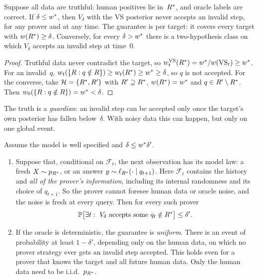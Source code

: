 \begin{theorem}\label{thm:caution:bayesdet}
Suppose all data are truthful: human positives lie in~$R^{*}$, and oracle labels are correct. If $\delta\le w^{*}$, then $V_\delta$ with the VS posterior never accepts an invalid step, for any prover and at any time. The guarantee is per target: it covers every target with $w(R^{*})\ge\delta$. Conversely, for every $\delta>w^{*}$ there is a two-hypothesis class on which $V_\delta$ accepts an invalid step at time~$0$.
\end{theorem}

\begin{proof}
Truthful data never contradict the target, so $w^{\mathrm{VS}}_t(R^{*})=w^{*}/w(\mathrm{VS}_t)\ge w^{*}$. For an invalid~$q$, $w_t(\{R:q\notin R\})\ge w_t(R^{*})\ge w^{*}\ge\delta$, so $q$ is not accepted. For the converse, take $\mathcal{H}=\{R^{*},R'\}$ with $R'\supsetneq R^{*}$, $w(R^{*})=w^{*}$ and $q\in R'\setminus R^{*}$. Then $w_0(\{R:q\notin R\})=w^{*}<\delta$.
\end{proof}

The truth is a \emph{guardian}: an invalid step can be accepted only once the target's own posterior has fallen below~$\delta$. With noisy data this can happen, but only on one global event.

\begin{theorem}\label{thm:caution:ville}
Assume the model is well specified and $\delta\le w^{*}\delta'$.
\begin{enumerate}[label=(\alph*)]
\item Suppose that, conditional on $\mathcal F_t$, the next observation has its model law: a fresh $X\sim p_{R^{*}}$, or an answer $y\sim\ell_{R^{*}}(\cdot\mid q_{t+1})$. Here $\mathcal F_t$ contains the history and \emph{all of the prover's information}, including its internal randomness and its choice of $q_{t+1}$. So the prover cannot foresee human data or oracle noise, and the noise is fresh at every query. Then for every such prover
\[
\mathbb{P}\big[\exists t:\ V_\delta\text{ accepts some }q_t\notin R^{*}\big]\le\delta'.
\]
\item If the oracle is deterministic, the guarantee is \emph{uniform}. There is an event of probability at least $1-\delta'$, depending only on the human data, on which no prover strategy ever gets an invalid step accepted. This holds even for a prover that knows the target and all future human data. Only the human data need to be i.i.d.\ $p_{R^{*}}$.
\end{enumerate}
\end{theorem}

